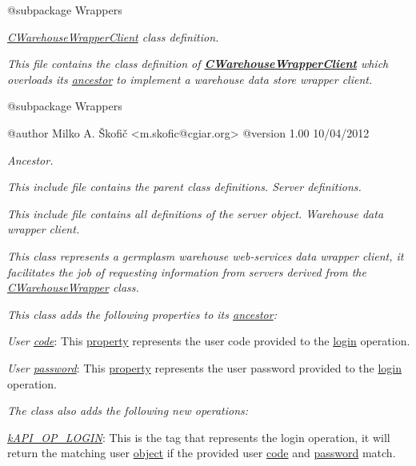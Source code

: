 {\itshape \begin{DoxyVerb} @subpackage        Wrappers\end{DoxyVerb}
}

{\itshape {\itshape \hyperlink{class_c_warehouse_wrapper_client}{C\-Warehouse\-Wrapper\-Client}} class definition.}

{\itshape This file contains the class definition of {\bfseries \hyperlink{class_c_warehouse_wrapper_client}{C\-Warehouse\-Wrapper\-Client}} which overloads its \hyperlink{class_c_mongo_data_wrapper_client}{ancestor} to implement a warehouse data store wrapper client.}

{\itshape \begin{DoxyVerb} @subpackage        Wrappers

 @author            Milko A. Škofič <m.skofic@cgiar.org>
 @version   1.00 10/04/2012\end{DoxyVerb}
}

{\itshape Ancestor.}

{\itshape This include file contains the parent class definitions. Server definitions.}

{\itshape This include file contains all definitions of the server object. Warehouse data wrapper client.}

{\itshape This class represents a germplasm warehouse web-\/services data wrapper client, it facilitates the job of requesting information from servers derived from the \hyperlink{class_c_warehouse_wrapper}{C\-Warehouse\-Wrapper} class.}

{\itshape This class adds the following properties to its \hyperlink{class_c_wrapper_client}{ancestor}\-:}

{\itshape 
\begin{DoxyItemize}
\item {\itshape User \hyperlink{}{code}}\-: This \hyperlink{}{property} represents the user code provided to the \hyperlink{}{login} operation. 
\item {\itshape User \hyperlink{}{password}}\-: This \hyperlink{}{property} represents the user password provided to the \hyperlink{}{login} operation. 
\end{DoxyItemize}}

{\itshape The class also adds the following new operations\-:}

{\itshape 
\begin{DoxyItemize}
\item {\itshape \hyperlink{}{k\-A\-P\-I\-\_\-\-O\-P\-\_\-\-L\-O\-G\-I\-N}}\-: This is the tag that represents the login operation, it will return the matching user \hyperlink{class_c_user}{object} if the provided user \hyperlink{}{code} and \hyperlink{}{password} match. 
\end{DoxyItemize}}


